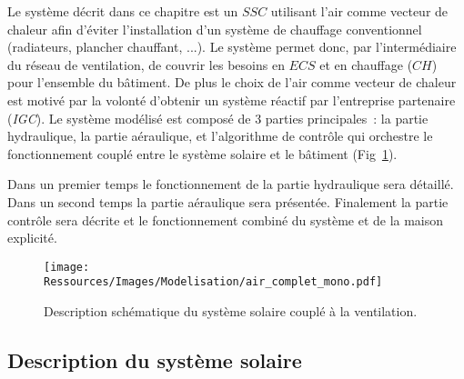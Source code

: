 Le système décrit dans ce chapitre est un $SSC$ utilisant l’air comme vecteur de chaleur
afin d’éviter l’installation d’un système de chauffage conventionnel (radiateurs, plancher
chauffant, ...). Le système permet donc, par l’intermédiaire du réseau de ventilation, de
couvrir les besoins en $ECS$ et en chauffage ($CH$) pour l’ensemble du bâtiment. De plus
le choix de l’air comme vecteur de chaleur est motivé par la volonté d’obtenir un système
réactif par l’entreprise partenaire (\emph{IGC}). Le système modélisé est composé de 3
parties principales~: la partie hydraulique, la partie aéraulique, et l’algorithme de
contrôle qui orchestre le fonctionnement couplé entre le système solaire et le bâtiment
(Fig~\ref{fig:air_complet_mono}).

Dans un premier temps le fonctionnement de la partie hydraulique sera détaillé. Dans un
second temps la partie aéraulique sera présentée. Finalement la partie contrôle sera
décrite et le fonctionnement combiné du système et de la maison explicité.

\begin{figure}
    \begin{center}
        \texttt{[image: Ressources/Images/Modelisation/air\_complet\_mono.pdf]}
    \end{center}
    \caption{Description schématique du système solaire couplé à la ventilation.
             \label{fig:air_complet_mono}}
\end{figure}




\subsection{Description du système solaire} %
\label{sub:description_du_systeme_solaire}
